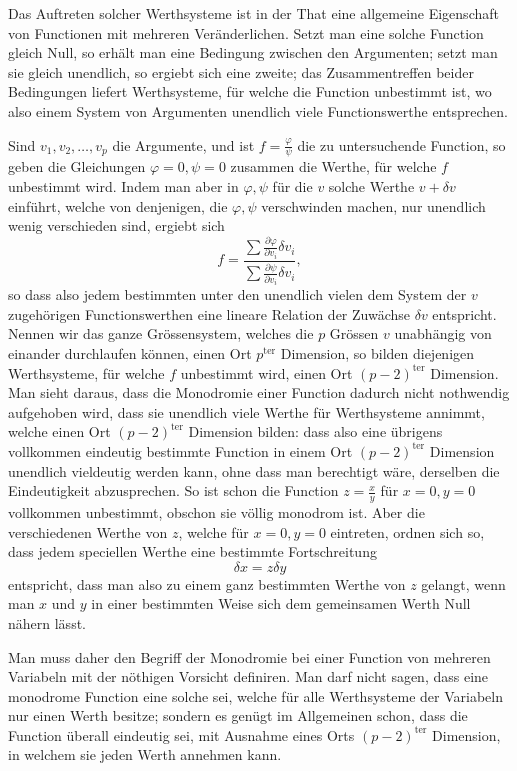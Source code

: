 \documentclass[10pt]{article}
\begin{document}
Das Auftreten solcher Werthsysteme ist in der That eine allgemeine Eigenschaft von Functionen mit mehreren Veränderlichen. Setzt man eine solche Function gleich Null, so erhält man eine Bedingung zwischen den Argumenten; setzt man sie gleich unendlich, so ergiebt sich eine zweite; das Zusammentreffen beider Bedingungen liefert Werthsysteme, für welche die Function unbestimmt ist, wo also einem System von Argumenten unendlich viele Functionswerthe entsprechen.

Sind \(v_1,v_2,\ldots,v_p\) die Argumente, und ist \(f=\frac{\varphi}{\psi}\) die zu untersuchende Function, so geben die Gleichungen \(\varphi=0,\psi=0\) zusammen die Werthe, für welche \(f\) unbestimmt wird. Indem man aber in \(\varphi,\psi\) für die \(v\) solche Werthe \(v+\delta v\) einführt, welche von denjenigen, die \(\varphi,\psi\) verschwinden machen, nur unendlich wenig verschieden sind, ergiebt sich
\[
f=\frac{\sum\frac{\partial\varphi}{\partial v_i}\delta v_i}{\sum\frac{\partial\psi}{\partial v_i}\delta v_i},
\]
so dass also jedem bestimmten unter den unendlich vielen dem System der \(v\) zugehörigen Functionswerthen eine lineare Relation der Zuwächse \(\delta v\) entspricht. Nennen wir das ganze Grössensystem, welches die \(p\) Grössen \(v\) unabhängig von einander durchlaufen können, einen Ort \(p^{\mathrm{ter}}\) Dimension, so bilden diejenigen Werthsysteme, für welche \(f\) unbestimmt wird, einen Ort \((p-2)^{\mathrm{ter}}\) Dimension. Man sieht daraus, dass die Monodromie einer Function dadurch nicht nothwendig aufgehoben wird, dass sie unendlich viele Werthe für Werthsysteme annimmt, welche einen Ort \((p-2)^{\mathrm{ter}}\) Dimension bilden: dass also eine übrigens vollkommen eindeutig bestimmte Function in einem Ort \((p-2)^{\mathrm{ter}}\) Dimension unendlich vieldeutig werden kann, ohne dass man berechtigt wäre, derselben die Eindeutigkeit abzusprechen. So ist schon die Function \(z=\frac{x}{y}\) für \(x=0,y=0\) vollkommen unbestimmt, obschon sie völlig monodrom ist. Aber die verschiedenen Werthe von \(z\), welche für \(x=0,y=0\) eintreten, ordnen sich so, dass jedem speciellen Werthe eine bestimmte Fortschreitung
\[
\delta x=z\delta y
\]
entspricht, dass man also zu einem ganz bestimmten Werthe von \(z\) gelangt, wenn man \(x\) und \(y\) in einer bestimmten Weise sich dem gemeinsamen Werth Null nähern lässt.

Man muss daher den Begriff der Monodromie bei einer Function von mehreren Variabeln mit der nöthigen Vorsicht definiren. Man darf nicht sagen, dass eine monodrome Function eine solche sei, welche für alle Werthsysteme der Variabeln nur einen Werth besitze; sondern es genügt im Allgemeinen schon, dass die Function überall eindeutig sei, mit Ausnahme eines Orts \((p-2)^{\mathrm{ter}}\) Dimension, in welchem sie jeden Werth annehmen kann.
\end{document}
